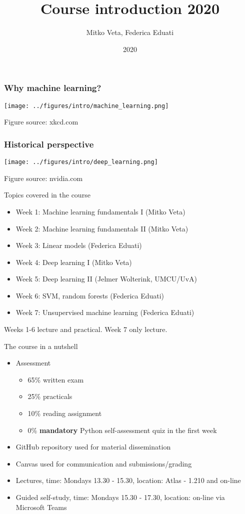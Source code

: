\documentclass[notes]{beamer}          %
\title{Course introduction 2020}
\author{Mitko Veta, Federica Eduati}
\institute{Eindhoven University of Technology

Department of Biomedical Engineering}
\date{2020}
\begin{document}
 
\frame{\titlepage}

\begin{frame}
\frametitle{Why machine learning?}
\begin{center}
\texttt{[image: ../figures/intro/machine\_learning.png]}
\end{center}
{\tiny Figure source: xkcd.com}
\end{frame}

\begin{frame}
\frametitle{Historical perspective}
\begin{center}
\texttt{[image: ../figures/intro/deep\_learning.png]}
\end{center}
{\tiny Figure source: nvidia.com}
\end{frame}

\begin{frame}{Topics covered in the course}
\begin{itemize}
    \item Week 1: Machine learning fundamentals I (Mitko Veta)
    \item Week 2: Machine learning fundamentals II (Mitko Veta)
    \item Week 3: Linear models (Federica Eduati)
    \item Week 4: Deep learning I (Mitko Veta)
    \item Week 5: Deep learning II (Jelmer Wolterink, UMCU/UvA)
    \item Week 6: SVM, random forests (Federica Eduati)
    \item Week 7: Unsupervised machine learning (Federica Eduati) 
\end{itemize}
$\,$\\
Weeks 1-6 lecture and practical. Week 7 only lecture.
\end{frame}

\begin{frame}{The course in a nutshell}
\begin{itemize}
    \item{Assessment}
        \begin{itemize}
            \item 65\% written exam
            \item 25\% practicals
            \item 10\% reading assignment
            \item 0\% \textbf{mandatory} Python self-assessment quiz in the first week
        \end{itemize}
    \item GitHub repository used for material dissemination
    \item Canvas used for communication and submissions/grading
    \item Lectures, time: Mondays 13.30 - 15.30, location: Atlas - 1.210 and on-line
    \item Guided self-study, time: Mondays 15.30 - 17.30, location: on-line via Microsoft Teams
    
\end{itemize}
\end{frame}
\end{document}
